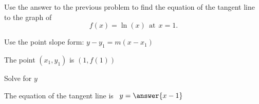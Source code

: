 \documentclass{ximera}
\begin{document}
\begin{problem} %
Use the answer to the previous problem to find the equation of the tangent line to the graph of 
\[
f(x) = \ln(x) \ \ \text{at} \ \ x=1.
\]
\begin{hint}
Use the point slope form: $y-y_1 = m(x-x_1)$
\end{hint}
\begin{hint}
The point $(x_1,y_1)$ is $(1, f(1))$
\end{hint}
\begin{hint}
Solve for $y$
\end{hint}
The equation of the tangent line is \ $y = \answer{x-1}$
\end{problem}



\begin{center}
\begin{foldable}
\end{foldable}
\end{center}
\end{document}
